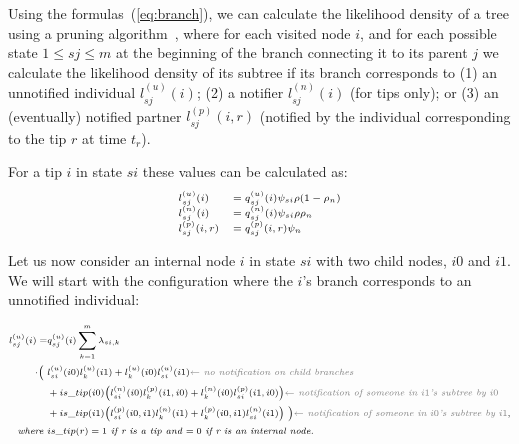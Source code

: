 \documentclass[a4paper,10pt]{article}
\begin{document}
Using the formulas~(\ref{eq:branch}), we can calculate the likelihood density of a tree using a pruning algorithm~\cite{10.1093/sysbio/22.3.240}, where for each visited node $i$, and for each possible state $1 \leq sj \leq m$ at the beginning of the branch connecting it to its parent $j$  we calculate the likelihood density of its subtree if its branch corresponds to (1) an unnotified individual $l^{(u)}_{sj}(i)$; (2) a notifier $l^{(n)}_{sj}(i)$ (for tips only); or (3) an (eventually) notified partner $l^{(p)}_{sj}(i, r)$ (notified by the individual corresponding to the tip $r$ at time $t_r$).

For a tip $i$ in state $si$ these values can be calculated as:
\begin{equation}
\scriptsize
\begin{array}{ll}
l^{(u)}_{sj}(i) &= q^{(u)}_{sj}(i)\psi_{si}\rho (1-\rho_{n})\\
l^{(n)}_{sj}(i) &= q^{(n)}_{sj}(i)\psi_{si}\rho \rho_{n}\\
l^{(p)}_{sj}(i, r) &= q^{(p)}_{sj}(i,r)\psi_{n}\\
\end{array}
\label{eq:tip}
\end{equation}

Let us now consider an internal node $i$ in state $si$ with two child nodes, $i0$ and $i1$. We will start with the configuration where the $i$'s branch corresponds to an unnotified individual:

\begin{equation}
\scriptsize
\begin{split}
l^{(u)}_{sj}(i) = &q^{(u)}_{sj}(i) \sum\limits_{k=1}^{m} \lambda_{si,k} \\
\cdot \Big(~&
l^{(u)}_{si}(i0)l^{(u)}_{k}(i1) + l^{(u)}_{k}(i0)l^{(u)}_{si}(i1)  \textit{\color{gray} $\leftarrow$ no notification on child branches} \\
& + is\_tip(i0) \big(l^{(n)}_{si}(i0)l^{(p)}_{k}(i1,i0) + l^{(n)}_{k}(i0)l^{(p)}_{si}(i1,i0) \big)\textit{\color{gray} $\leftarrow$ notification of someone in $i1$'s subtree by $i0$} \\
&+ is\_tip(i1) \big(l^{(p)}_{si}(i0,i1)l^{(n)}_{k}(i1) + l^{(p)}_{k}(i0,i1)l^{(n)}_{si}(i1) \big)~\Big) \textit{\color{gray} $\leftarrow$ notification of someone in $i0$'s subtree by $i1$},\\
\textit{where } & is\_tip(r) = 1 \textit{ if r is a tip and $= 0$ if r is an internal node.}
\end{split}\label{eq:lu}
\end{equation}
\end{document}
